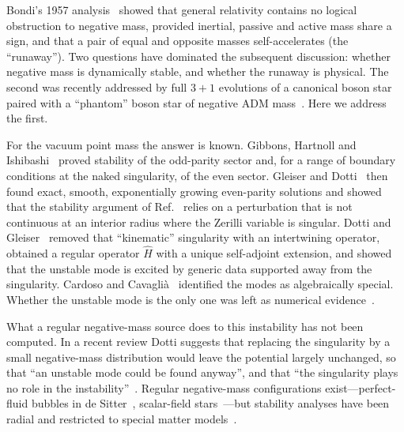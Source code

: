 \documentclass[11pt]{article}
\theoremstyle{remark}
\newcommand{\Hhat}{\hat{H}}
\begin{document}
Bondi's 1957 analysis~\cite{Bondi1957} showed that general relativity contains no logical obstruction to negative
mass, provided inertial, passive and active mass share a sign, and that a pair of equal and opposite masses
self-accelerates (the ``runaway''). Two questions have dominated the subsequent discussion: whether negative mass is
dynamically stable, and whether the runaway is physical. The second was recently addressed by full $3+1$ evolutions of a
canonical boson star paired with a ``phantom'' boson star of negative ADM mass~\cite{Shirokov2026}. Here we address the
first.

For the vacuum point mass the answer is known. Gibbons, Hartnoll and Ishibashi~\cite{GHI2005} proved stability of the
odd-parity sector and, for a range of boundary conditions at the naked singularity, of the even sector. Gleiser and
Dotti~\cite{GD2006} then found exact, smooth, exponentially growing even-parity solutions and showed that the stability
argument of Ref.~\cite{GHI2005} relies on a perturbation that is not continuous at an interior radius where the Zerilli
variable is singular. Dotti and Gleiser~\cite{DG2009} removed that ``kinematic'' singularity with an intertwining
operator, obtained a regular operator $\Hhat$ with a unique self-adjoint extension, and showed that the unstable mode is
excited by generic data supported away from the singularity. Cardoso and Cavagli\`a~\cite{CC2006} identified the modes as
algebraically special. Whether the unstable mode is the only one was left as numerical evidence~\cite{DG2009}.

What a regular negative-mass source does to this instability has not been computed. In a recent review Dotti suggests
that replacing the singularity by a small negative-mass distribution would leave the potential largely unchanged, so
that ``an unstable mode could be found anyway'', and that ``the singularity plays no role in the
instability''~\cite{Dotti2022}. Regular negative-mass configurations exist---perfect-fluid bubbles in de
Sitter~\cite{MP2014}, scalar-field stars~\cite{Shirokov2026}---but stability analyses have been radial and restricted to
special matter models~\cite{Johnson2020,Alves2025}.
\end{document}

